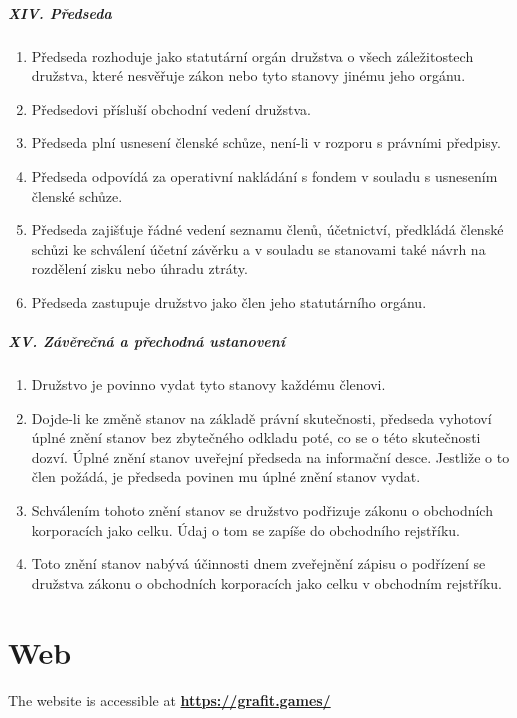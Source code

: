 \paragraph{XIV. Předseda}
\begin{enumerate}
    \item Předseda rozhoduje jako statutární orgán družstva o všech záležitostech družstva, které nesvěřuje zákon nebo tyto stanovy jinému jeho orgánu.
    \item Předsedovi přísluší obchodní vedení družstva.
    \item Předseda plní usnesení členské schůze, není-li v rozporu s právními předpisy.
    \item Předseda odpovídá za operativní nakládání s fondem v souladu s usnesením členské schůze.
    \item Předseda zajišťuje řádné vedení seznamu členů, účetnictví, předkládá členské schůzi ke schválení účetní závěrku a v souladu se stanovami také návrh na rozdělení zisku nebo úhradu ztráty.
    \item Předseda zastupuje družstvo jako člen jeho statutárního orgánu.
\end{enumerate}

\paragraph{XV. Závěrečná a přechodná ustanovení}
\begin{enumerate}
    \item Družstvo je povinno vydat tyto stanovy každému členovi.
    \item Dojde-li ke změně stanov na základě právní skutečnosti, předseda vyhotoví úplné znění stanov bez zbytečného odkladu poté, co se o této skutečnosti dozví. Úplné znění stanov uveřejní předseda na informační desce. Jestliže o to člen požádá, je předseda povinen mu úplné znění stanov vydat.
    \item Schválením tohoto znění stanov se družstvo podřizuje zákonu o obchodních korporacích jako celku. Údaj o tom se zapíše do obchodního rejstříku.
    \item Toto znění stanov nabývá účinnosti dnem zveřejnění zápisu o podřízení se družstva zákonu o obchodních korporacích jako celku v obchodním rejstříku.
\end{enumerate}

\chapter{Web}
The website is accessible at \href{https://grafit.games/}{\textbf{https://grafit.games/}}

